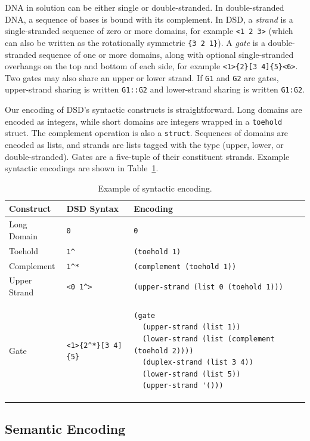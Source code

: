 \documentclass{article}[10pt]
\begin{document}
DNA in solution can be either single or double-stranded.
In double-stranded DNA, a sequence of bases is bound with its complement.
In DSD, a \emph{strand} is a single-stranded sequence of zero or more domains, for
example \verb;<1 2 3>; (which can also be written as the rotationally symmetric
\verb;{3 2 1};).
A \emph{gate} is a double-stranded sequence of one or more domains,
along with optional single-stranded overhangs on the top and bottom of each
side, for example \verb;<1>{2}[3 4]{5}<6>;.
Two gates may also share an upper or lower strand. If \verb;G1; and \verb;G2;
are gates, upper-strand sharing is written \verb;G1::G2; and lower-strand
sharing is written \verb;G1:G2;.

Our encoding of DSD's syntactic constructs is straightforward.
Long domains are encoded as integers, while
short domains are integers wrapped in a \verb;toehold; struct.
The complement operation is also a \verb;struct;.
Sequences of domains are encoded as lists, and strands are lists
tagged with the type (upper, lower, or double-stranded). Gates
are a five-tuple of their constituent strands.
Example syntactic encodings are shown in Table~\ref{table:encoding-example}.

\begin{table}
\begin{tabular}{|l|l|l|} \hline
Construct     & DSD Syntax    & Encoding                      \\ \hline
Long Domain   & \verb;0;      & \verb;0;                      \\ \hline
Toehold       & \verb;1^;     & \verb;(toehold 1);            \\ \hline
Complement    & \verb;1^*;    & \verb;(complement (toehold 1)); \\ \hline
Upper Strand  & \verb;<0 1^>; & \verb;(upper-strand (list 0 (toehold 1))); \\
\hline
Gate          & \verb;<1>{2^*}[3 4]{5}; &
\begin{lstlisting}
(gate
  (upper-strand (list 1))
  (lower-strand (list (complement (toehold 2))))
  (duplex-strand (list 3 4))
  (lower-strand (list 5))
  (upper-strand '()))
\end{lstlisting}
\\
\hline
\end{tabular}
\caption{Example of syntactic encoding.}
\label{table:encoding-example}
\end{table}

\subsection{Semantic Encoding}
\end{document}

